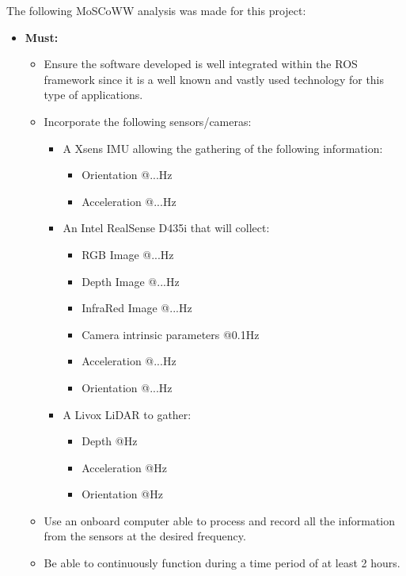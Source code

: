 The following MoSCoWW analysis was made for this project:

\begin{itemize}
    \item \textbf{Must:}
    \begin{itemize}
        \item Ensure the software developed is well integrated within the ROS framework since it is a well known and vastly used technology for this type of applications.
        \item Incorporate the following sensors/cameras:
        \begin{itemize}
            \item A Xsens IMU allowing the gathering of the following information: 
            \begin{itemize}
                \item Orientation @...Hz
                \item Acceleration @...Hz
            \end{itemize}
            \item An Intel RealSense D435i that will collect: 
            \begin{itemize}
                \item RGB Image @...Hz
                \item Depth Image @...Hz
                \item InfraRed Image @...Hz
                \item Camera intrinsic parameters @0.1Hz
                \item Acceleration @...Hz
                \item Orientation @...Hz
            \end{itemize}
            \item A Livox LiDAR to gather:
            \begin{itemize}
                \item Depth @Hz
                \item Acceleration @Hz
                \item Orientation @Hz
            \end{itemize}
        \end{itemize}
        \item Use an onboard computer able to process and record all the information from the sensors at the desired frequency.
        \item Be able to continuously function during a time period of at least 2 hours.

\end{itemize}
\end{itemize}

